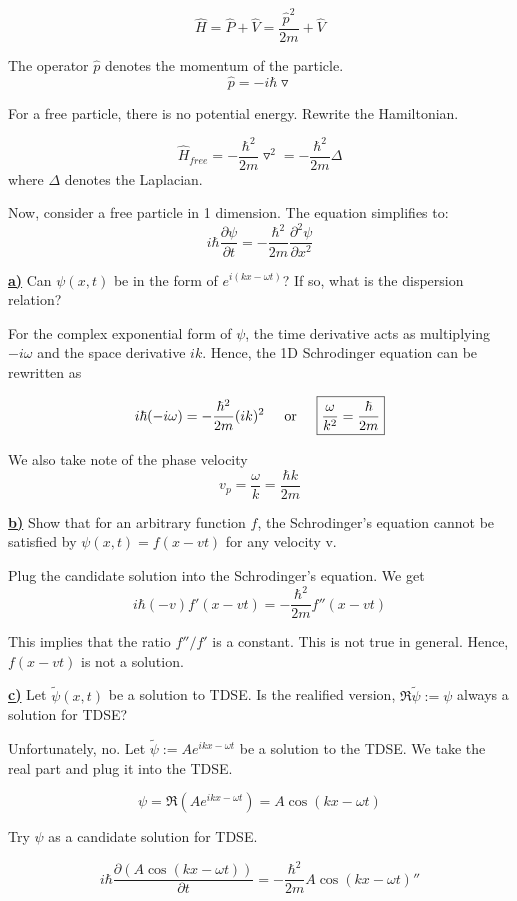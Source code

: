 \documentclass{article}
\newcommand{\new}[1]{
    \vspace{2mm}
    \noindent
    \textbf{
    \underline{#1}}
}
\newcommand{\textOr}{
    {
        \hspace{5mm}
        \textrm{or}
        \hspace{5mm}
    }
}
\newcommand{\Ixp}[1]{
    {
        e^{i{#1}}
    }
}
\begin{document}
\[
    \hat H = \hat P + \hat V = 
    \frac {\hat p ^2} {2m} + \hat V
\]

The operator $\hat p$ denotes the momentum of the particle. 
\[
    \hat p = -i \hbar \triangledown 
\]

For a free particle, there is no potential energy. Rewrite the Hamiltonian. 

\[
    \hat H_{free} = - \frac {\hbar^2}{2m} \triangledown^2
    = -\frac{\hbar^2}{2m} \Delta
\]
where $\Delta$ denotes the Laplacian. 

Now, consider a free particle in 1 dimension. The equation simplifies to: 
\[
    i \hbar \frac{\partial\psi}{\partial t} = -\frac{\hbar^2}{2m} \frac{\partial^2 \psi}{\partial x^2}
\]

\new{a)} Can $\psi(x, t)$ be in the form of $\Ixp{(kx - \omega t)}$? If so, 
what is the dispersion relation?

For the complex exponential form of $\psi$, the time derivative 
acts as multiplying $-i\omega$ and the space derivative $ik$. Hence, 
the 1D Schrodinger equation can be rewritten as 

\[
    i \hbar (-i\omega) = -\frac {\hbar^2}{2m} (ik)^2
    \textOr 
    \boxed{
    \frac \omega {k^2} = \frac \hbar {2m}
    }
\]

We also take note of the phase velocity 
\[
    v_p = \frac \omega k = \frac{\hbar k} {2m}
\]

\new{b)} Show that for an arbitrary function $f$, the Schrodinger's 
equation cannot be satisfied by $\psi(x, t) = f(x - vt)$ for any velocity v. 

Plug the candidate solution into the Schrodinger's equation. We get 
\[
    i\hbar (-v)f'(x - vt) = -\frac{\hbar^2}{2m} f''(x - vt)
\]

This implies that the ratio $f''/f'$ is a constant. This is not true 
in general. Hence, $f(x - vt)$ is not a solution. 

\new{c)} Let $\tilde \psi(x, t)$ be a solution to TDSE. Is the 
realified version, $\Re{\tilde \psi} := \psi$ always a solution 
for TDSE?

Unfortunately, no. Let $\tilde \psi := A\Ixp{{kx - \omega t}}$
be a solution to the TDSE. We take the real part and plug it 
into the TDSE. 

\[
    \psi = \Re ( A\Ixp{{kx - \omega t}})= A\cos(kx - \omega t)
\]

Try $\psi$ as a candidate solution for TDSE. 

\[
    i \hbar \frac{\partial (A\cos(kx - \omega t))}{\partial t}
    = -\frac{\hbar^2}{2m} A\cos(kx - \omega t)''
\]
\end{document}
